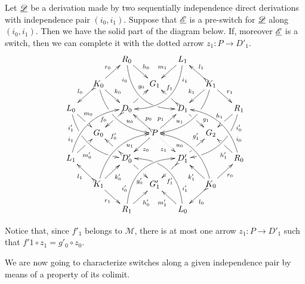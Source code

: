 \begin{remark}\label{rem:quadrati}
Let $\underline{\mathscr{D}}$ be a derivation made by two sequentially independence direct derivations with independence pair $(i_0, i_1)$. Suppose that $\underline{\mathscr{E}}$ is a pre-switch for $\underline{\mathscr{D}}$ along $(i_0, i_1)$. Then we have the solid part of the diagram below. If, moreover $\underline{\mathscr{E}}$ is a switch, then we can complete it with the dotted arrow $z_1\colon P\to D'_1$. 
		\[\xymatrix@C=15pt@R=15pt{&&R_0 \ar@/_.8cm/[ddrr]_(.2){i_0}|(.7)\hole
		\ar[dr]^{h_0}&& L_1\ar@/^.8cm/[ddll]^(.2){i_1}
		\ar[dl]_{m_1}\\&K_0\ar[dr]^{k_0}\ar@{>->}[dl]_{l_0}
		\ar@/_.6cm/[ddrr]|(.36)\hole^(.65){u_0}\ar[ur]^{r_0}&& G_1 &&
		K_1
		\ar@/^.6cm/[ddll]|(.36)\hole_(.65){u_1}\ar[dl]_{k_1}\ar@{>->}[lu]_{l_1}
		\ar[dr]^{r_1}\\L_0
		\ar@/_.6cm/[ddrr]_(.2){i'_1}|(.31)\hole|(.81)\hole
		\ar[dr]^(.4){m_0}|(.61)\hole && D_0
		\ar@{>->}[dl]|(.4)\hole_(.65){f_0}\ar[ur]|(.5)\hole^(.7){g_0}&&D_1
		\ar[dr]|(.4)\hole^(.65){g_1}
		\ar@{>->}[ul]|(.5)\hole_(.65){f_1}&&R_1\ar@/^.6cm/[ddll]^(.2){i'_0}|(.31)\hole|(.81)\hole\ar[dl]_{h_1}|(.6)\hole\\&G_0
		&&P\ar@{.>}[dr]_{z_1}	\ar@{>}[dl]^{z_0}\ar[ur]^(.4){p_1}\ar@{>->}[ul]_(.4){p_0}&&G_2\\L_1	\ar@/^.6cm/[uurr]^(.2){i_1} \ar[ur]_(.35){m'_0}|(.61)\hole && D'_0	\ar@{>->}[ul]|(.4)\hole_(.65){f'_0}\ar[dr]|(.5)\hole_(.65){g'_0}	&&D'_1\ar[ur]|(.4)\hole^(.65){g'_1} \ar@{>->}[dl]|(.5)\hole^(.65){f'_1}	&& R_0 \ar[ul]^(.35){h'_1}|(.61)\hole\ar@/_.6cm/[uull]_(.2){i_0}\\ &K_1	\ar[ur]_{k'_0} \ar[dr]_{r_1}	\ar@{>->}[ul]^{l_1}\ar@/^.6cm/[uurr]_(.65){u_1}&&G'_1&& K_0\ar[ur]_{r_0} \ar[ul]^{k'_1} \ar@{>->}[dl]^{l_0} \ar@/_.6cm/[uull]^(.65){u_0}\\&& R_1	\ar[ur]_{h'_0}\ar@/^.8cm/[uurr]^(.2){i'_0}&& L_0 \ar[ul]^{m'_1} \ar@/_.8cm/[uull]_(.2){i'_1} |(.69)\hole }\] 
\end{remark} 

\begin{remark}\label{rem:un}
	Notice that, since $f'_1$ belongs to $\mathcal{M}$, there is at most one arrow $z_1\colon P\to D'_1$ such that $f'{1}\circ z_1=g'_0\circ z_0$.
\end{remark}


We are now going to characterize switches along a given independence pair by means of a property of its colimit.

